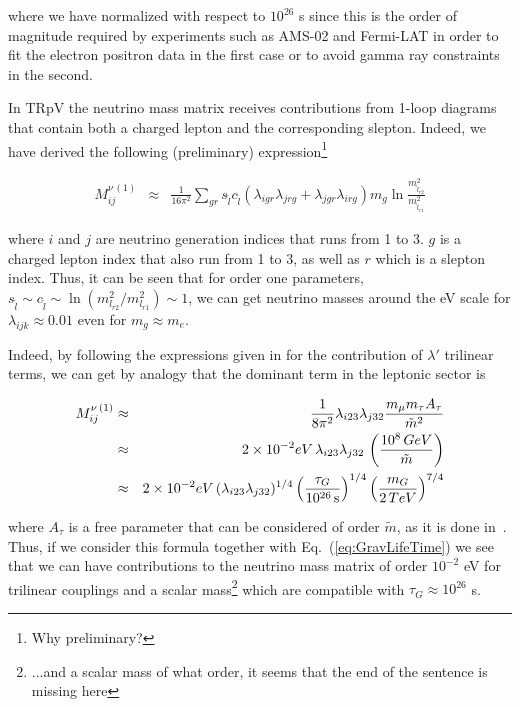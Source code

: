 \documentclass[a4paper,11pt]{article}
\begin{document}
\noindent where we have normalized with respect to $10^{26}$ s
since this is the order of magnitude required by experiments such
as AMS-02 and Fermi-LAT in order to fit the electron positron data
in the first case or to avoid gamma ray constraints in the second.



In TRpV the neutrino mass matrix receives contributions from
1-loop diagrams that contain both a charged lepton and the corresponding
slepton. Indeed, we have derived the following (preliminary) expression\footnote{Why preliminary?}

\begin{eqnarray*}
M_{ij}^{\nu\,(1)} & \approx & \frac{1}{16\pi^{2}}\sum_{gr}s_{\tilde{l}}c_{\tilde{l}}(\lambda_{igr}\lambda_{jrg}+\lambda_{jgr}\lambda_{irg})m_{g}\ln\frac{m_{\tilde{l}_{r2}}^{2}}{m_{\tilde{l}_{r1}}^{2}}
\end{eqnarray*}


\noindent where $i$ and $j$ are neutrino generation indices that
runs from 1 to 3. $g$ is a charged lepton index that also run from
1 to 3, as well as $r$ which is a slepton index. Thus, it can be
seen that for order one parameters, $s_{\tilde{l}} \sim c_{\tilde{l}} \sim \ln(m_{l_{r2}}^{2}/m_{l_{r1}}^{2})\sim 1$, we can get neutrino masses around the eV scale for $\lambda_{ijk}\approx0.01$
even for $m_{g}\approx m_{e}$. 


Indeed, by following the expressions given in \cite{Chun:2004mu} for the
contribution of $\lambda'$ trilinear terms, we can get by analogy
that the dominant term in the leptonic sector is 

\begin{eqnarray*}
M_{ij}^{\nu\,(1)} & \approx & \frac{1}{8\pi^{2}}\lambda_{i23}\lambda_{j32}\frac{m_{\mu}m_{\tau}A_{\tau}}{\tilde{m}^{2}}\\
 & \approx & 2\times10^{-2}\mbox{eV}\,\lambda_{i23}\lambda_{j32}\,\left(\frac{10^{8}\mbox{\,GeV}}{\tilde{m}}\right)\\
 & \approx & 2 \times10^{-2}\mbox{eV}\,(\lambda_{i23}\lambda_{j32})^{1/4}\left(\frac{\tau_{G}}{10^{\text{26}}\,\text{s}}\right)^{1/4}\left(\frac{m_{G}}{2\,\mbox{TeV}}\right)^{7/4}
\end{eqnarray*}


\noindent where $A_{\tau}$ is a free parameter that can be considered
of order $\tilde{m}$, as it is done in~\cite{Chun:2004mu}. Thus, if we
consider this formula together with Eq.~(\ref{eq:GravLifeTime}) we
see that we can have contributions to the neutrino mass matrix of
order $10^{-2}$ eV for trilinear couplings and a scalar mass\footnote{...and a  scalar mass of what order, it seems that the end of the sentence is missing here}
which are compatible with $\tau_{G}\approx10^{26}$ s.

\clearpage


\end{document}
